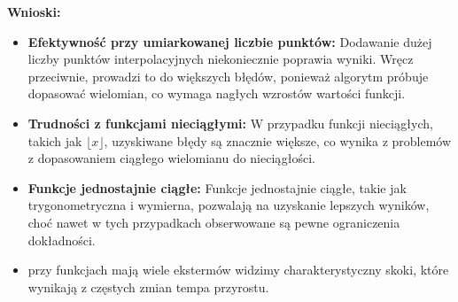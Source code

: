 \textbf{Wnioski:}
\begin{itemize}
    \item \textbf{Efektywność przy umiarkowanej liczbie punktów:} Dodawanie dużej liczby punktów interpolacyjnych niekoniecznie poprawia wyniki. Wręcz przeciwnie, prowadzi to do większych błędów, ponieważ algorytm próbuje dopasować wielomian, co wymaga nagłych wzrostów wartości funkcji.
    \item \textbf{Trudności z funkcjami nieciągłymi:} W przypadku funkcji nieciągłych, takich jak \( \lfloor x \rfloor \), uzyskiwane błędy są znacznie większe, co wynika z problemów z dopasowaniem ciągłego wielomianu do nieciągłości.
    \item \textbf{Funkcje jednostajnie ciągłe:} Funkcje jednostajnie ciągłe, takie jak trygonometryczna i wymierna, pozwalają na uzyskanie lepszych wyników, choć nawet w tych przypadkach obserwowane są pewne ograniczenia dokładności.
    \item przy funkcjach mają wiele ekstermów widzimy charakterystyczny skoki, które wynikają z częstych zmian tempa przyrostu. 
\end{itemize}
